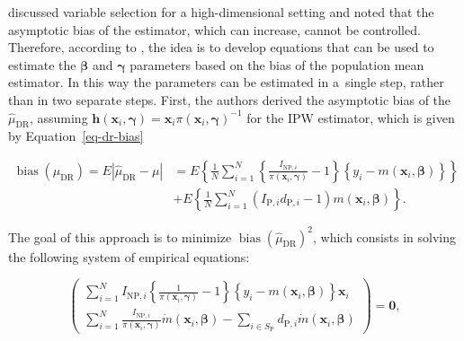 \documentclass[nojss]{jss}
\begin{document}
\citet{yang_doubly_2020} discussed variable selection for a
high-dimensional setting and noted that the asymptotic bias of the
estimator, which can increase, cannot be controlled. Therefore,
according to \citet{yang_doubly_2020}, the idea is to develop equations
that can be used to estimate the \(\boldsymbol{\beta}\) and
\(\boldsymbol{\gamma}\) parameters based on the bias of the population
mean estimator. In this way the parameters can be estimated in a~single
step, rather than in two separate steps. First, the authors derived the
asymptotic bias of the \(\hat{\mu}_{\text{DR}}\), assuming
\(\boldsymbol{h}(\boldsymbol{x}_i, \boldsymbol{\gamma})=\boldsymbol{x}_i\pi(\boldsymbol{x}_i, \boldsymbol{\gamma})^{-1}\)
for the IPW estimator, which is given by Equation~\ref{eq-dr-bias}

\begin{equation}
\begin{aligned}
\operatorname{bias}\left(\hat{\mu}_{\text{DR}}\right) = E|\hat{\mu}_{\text{DR}}-\mu| &=
E\left\{\frac{1}{N} \sum_{i=1}^N\left\{\frac{I_{\text{NP},i}}{\pi\left(\boldsymbol{x}_i, \boldsymbol{\gamma}\right)} - 1\right\}\left\{y_i-m\left(\boldsymbol{x}_i, \boldsymbol{\beta}\right)\right\} \right\}\\
& + E\left\{\frac{1}{N} \sum_{i=1}^N\left(I_{\text{P},i} d_{\text{P},i}-1\right) m\left(\boldsymbol{x}_i, \boldsymbol{\beta}\right)\right\}.
\end{aligned}
\label{eq-dr-bias}
\end{equation}

The goal of this approach is to minimize
\(\operatorname{bias}\left(\hat{\mu}_{\text{DR}}\right)^2\), which
consists in solving the following system of empirical equations:

\begin{equation}
\left(\begin{array}{c}
\sum_{i=1}^N I_{\text{NP},i}\left\{\frac{1}{\pi\left(\boldsymbol{x}_i, \boldsymbol{\gamma}\right)}-1\right\}\left\{y_i-m\left(\boldsymbol{x}_i, \boldsymbol{\beta}\right)\right\} \boldsymbol{x}_i \\
\sum_{i=1}^N \frac{I_{\text{NP},i}}{\pi\left(\boldsymbol{x}_i, \boldsymbol{\gamma}\right)} \dot{m}\left(\boldsymbol{x}_i, \boldsymbol{\beta}\right) -\sum_{i \in S_{\text{P}}} d_{\text{P},i} \dot{m}\left(\boldsymbol{x}_i, \boldsymbol{\beta}\right)
\end{array}\right) = \boldsymbol{0},
\label{eq-bias-min}
\end{equation}
\end{document}
